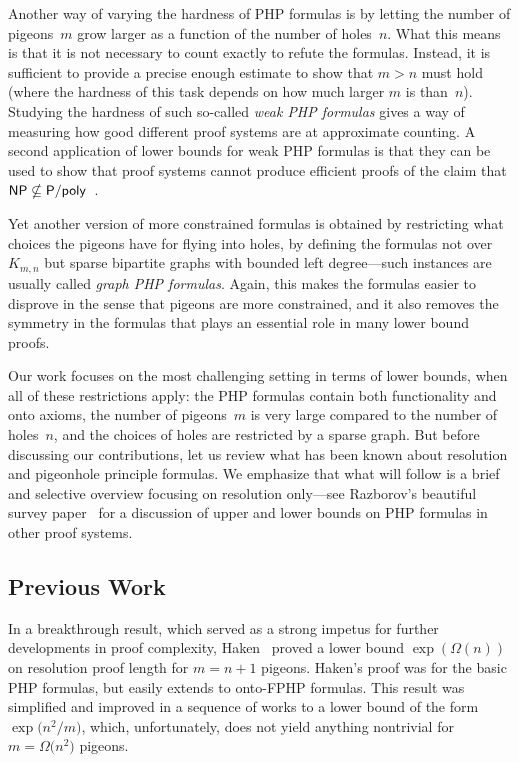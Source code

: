 \documentclass{theoretics}
\newcommand{\Bigomega}[1]{\Omega \bigl( #1 \bigr)}
\newcommand{\bigomega}[1]{\Omega ( #1 )}
\newcommand{\complclassformat}[1]{\textrm{\upshape{\textsf{#1}}}\xspace}
\newcommand{\NP}{\complclassformat{NP}}
\newcommand{\Ppoly}{\complclassformat{P/poly}}
\newcommand{\introduceterm}[1]{{\emph{#1}}}
\newcommand{\squeezesubsection}[1]{\subsection{#1}}
\numberwithin{equation}{section}
\begin{document}
Another way of varying the hardness of PHP formulas is  by letting the
number of pigeons~$m$ grow larger as a function of the number of
holes~$n$.  
What this means is that it is not necessary to
count exactly to refute the formulas. Instead, it is sufficient 
to provide
a precise enough estimate 
to show that $m>n$
must hold (where the hardness of this task depends on how much larger
$m$ is than~$n$).
Studying the hardness of such so-called
\introduceterm{weak PHP formulas}
gives a way of measuring how good different proof systems
are at approximate counting.
A second
application of  lower bounds
for weak PHP  formulas is that they  can be used to show that proof
systems cannot produce efficient proofs of the claim that
\mbox{$\NP \nsubseteq \Ppoly$
\cite{Razborov98LowerBound,Razborov04ResolutionLowerBoundsPM}.}

Yet another version of more constrained formulas is obtained by
restricting what choices the pigeons have for flying into holes, by
defining the formulas not over~$K_{m,n}$ but
sparse bipartite
graphs with bounded left degree---such instances are usually called
\introduceterm{graph PHP formulas}.
Again, this makes the formulas easier to disprove in the sense that
pigeons are more constrained, and it also removes the symmetry in the
formulas that plays an essential role in many lower bound proofs.

Our work focuses on the most challenging setting in terms of lower
bounds, when all of these restrictions apply: 
the PHP formulas contain both functionality and onto axioms,
the number of  pigeons~$m$ is very large
compared to the number of holes~$n$,  
and the choices of holes are restricted by a sparse graph. 
But before discussing our contributions, let us review what has been
known about resolution and pigeonhole principle formulas.
We emphasize that what will follow is a brief and selective overview
focusing on resolution only---see Razborov's beautiful survey
paper~\cite{Razborov02ProofComplexityPHP} 
for a discussion of upper and lower bounds on PHP formulas in other
proof systems.



\squeezesubsection{Previous Work}
   
In a breakthrough result, which
served as a strong impetus for further developments in proof complexity,
Haken~\cite{Haken85Intractability} proved a lower bound
$\exp ( \bigomega{n}) $
on resolution proof length for $m=n+1$ pigeons.
Haken's proof was for the basic PHP formulas, but easily extends to
onto-FPHP formulas. 
This result was simplified and improved in a sequence of works
\cite{BP96Simplified,BW01ShortProofs,BT88ResolutionProofs,Urq03}
to a lower bound of the form
$\exp \bigl( n^2 / m \bigr)$,
which, unfortunately, does not yield anything nontrivial for 
$m = \Bigomega{n^2}$ pigeons.
\end{document}
